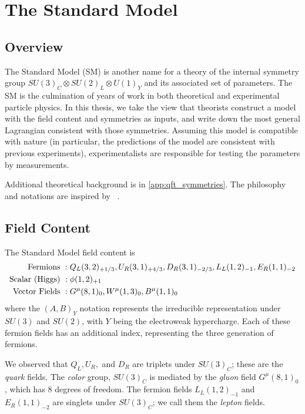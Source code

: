 \chapter{The Standard Model}\label{ch:sm}

\section{Overview}

The Standard Model (SM) is another name for a theory of the internal symmetry group $SU(3)_C \otimes SU(2)_L \otimes U(1)_Y$ and its associated set of parameters.
The SM is the culmination of years of work in both theoretical and experimental particle physics.
In this thesis, we take the view that theorists construct a model with the field content and symmetries as inputs, and write down the most general Lagrangian consistent with those symmetries.
Assuming this model is compatible with nature (in particular, the predictions of the model are consistent with previous experiments), experimentalists are responsible for testing the parameters by measurements.

Additional theoretical background is in \ref{app:qft_symmetries}.
The philosophy and notations are inspired by ~\cite{yuvalSMLectures, Buchmuller:984122}.

\section{Field Content}\label{sec:field_content}

The Standard Model field content is
\begin{align}
\text{Fermions }       &:  Q_L(3,2)_{+1/3}, \xspace  U_R(3,1)_{+4/3},\xspace  D_R(3,1)_{-2/3} ,\xspace  L_L(1,2)_{-1} ,\xspace  E_R(1,1)_{-2} \notag \\
\text{Scalar (Higgs) } &:  \phi(1,2)_{+1} \\
\text{Vector Fields }  &:  G^\mu(8,1)_0 , \xspace W^\mu(1,3)_0 , \xspace B^\mu(1,1)_0 \notag
\end{align}
where the $(A, B)_Y$ notation represents the irreducible representation under $SU(3)$ and $SU(2)$, with $Y$ being the electroweak hypercharge.
Each of these fermion fields has an additional index, representing the three generation of fermions.

We observed that $Q_L, U_R,$ and $D_R$ are triplets under $SU(3)_C$; these are the \textit{quark} fields.
The \textit{color} group, $SU(3)_C$ is mediated by the \textit{gluon} field $G^\mu(8,1)_0$, which has 8 degrees of freedom.
The fermion fields $L_L(1,2)_{-1}$ and $  E_R(1,1)_{-2} $ are singlets under $SU(3)_C$; we call them the \textit{lepton} fields.


